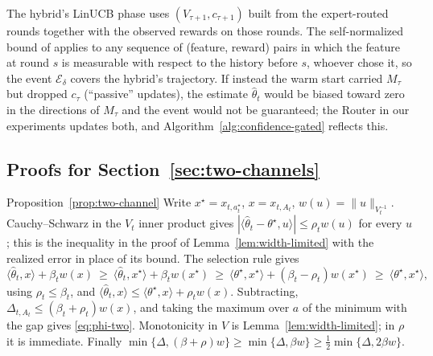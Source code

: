 \documentclass[anon]{alt2027} %
\newcommand{\wid}{w}
\begin{document}
\begin{remark}
The hybrid's LinUCB phase uses $(V_{\tau+1},c_{\tau+1})$ built from the
expert-routed rounds together with the observed rewards on those rounds. The
self-normalized bound of \citet{abbasi2011improved} applies to any sequence of
(feature, reward) pairs in which the feature at round $s$ is measurable with
respect to the history before $s$, whoever chose it, so the event
$\mathcal E_\delta$ covers the hybrid's trajectory. If instead the warm start
carried $M_\tau$ but dropped $c_\tau$ (``passive'' updates), the estimate
$\widehat\theta_t$ would be biased toward zero in the directions of $M_\tau$
and the event would not be guaranteed; the Router in our experiments updates
both, and Algorithm~\ref{alg:confidence-gated} reflects this.
\end{remark}

\subsection{Proofs for Section~\ref{sec:two-channels}}
\label{app:proof-two-channels}

\begin{proofof}{Proposition~\ref{prop:two-channel}}
Write $x^\star=x_{t,a_t^\star}$, $x=x_{t,A_t}$, $\wid(u)=\|u\|_{V_t^{-1}}$.
Cauchy--Schwarz in the $V_t$ inner product gives
$|\langle\widehat\theta_t-\theta^\star,u\rangle|\le\rho_t\wid(u)$ for every $u$;
this is the inequality in the proof of Lemma~\ref{lem:width-limited} with the
realized error in place of its bound. The selection rule gives
\[
\langle\widehat\theta_t,x\rangle+\beta_t\wid(x)
\ \ge\ \langle\widehat\theta_t,x^\star\rangle+\beta_t\wid(x^\star)
\ \ge\ \langle\theta^\star,x^\star\rangle+(\beta_t-\rho_t)\wid(x^\star)
\ \ge\ \langle\theta^\star,x^\star\rangle,
\]
using $\rho_t\le\beta_t$, and
$\langle\widehat\theta_t,x\rangle\le\langle\theta^\star,x\rangle+\rho_t\wid(x)$.
Subtracting, $\Delta_{t,A_t}\le(\beta_t+\rho_t)\wid(x)$, and taking the maximum
over $a$ of the minimum with the gap gives \eqref{eq:phi-two}. Monotonicity in
$V$ is Lemma~\ref{lem:width-limited}; in $\rho$ it is immediate. Finally
$\min\{\Delta,(\beta+\rho)w\}\ge\min\{\Delta,\beta w\}\ge\tfrac12\min\{\Delta,2\beta w\}$.
\end{proofof}
\end{document}

